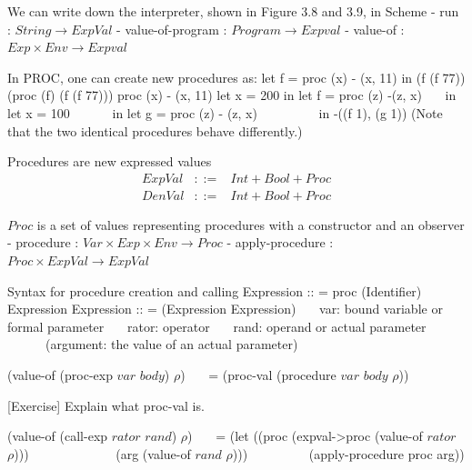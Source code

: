 \documentclass{article}
\begin{document}
\begin{huge}
We can write down the interpreter, shown in Figure 3.8 and 3.9, in Scheme \al
- run : $String \rightarrow ExpVal$ \al
- value-of-program : $Program \rightarrow Expval$ \al
- value-of : $Exp \times Env \rightarrow Expval$ 


In PROC, one can create new procedures as: \al
\al
let f = proc (x) - (x, 11) \al
in (f (f 77)) \al
\al
(proc (f) (f (f 77))) \al
proc (x) - (x, 11) \al
\al
let x = 200 \al
in let f = proc (z) -(z, x) \al
\ \ \ in let x = 100 \al
\ \ \ \ \ \ in let g = proc (z) - (z, x) \al
\ \ \ \ \ \ \ \ \ in -((f 1), (g 1)) \al
(Note that the two identical procedures behave differently.)


Procedures are new expressed values
\begin{eqnarray*}
ExpVal & ::= & Int + Bool + Proc \\
DenVal & ::= & Int + Bool + Proc 
\end{eqnarray*}

$Proc$ is a set of values representing procedures with a constructor and an observer \al
- procedure : $Var \times Exp \times Env \rightarrow Proc$  \al
- apply-procedure : $Proc \times ExpVal \rightarrow ExpVal$ 



Syntax for procedure creation and calling \al
\al
Expression :: = proc (Identifier) Expression  \al
Expression :: = (Expression Expression)  \al
\al
\ \ \ var: bound variable or formal parameter \al
\ \ \ rator: operator \al
\ \ \ rand: operand or actual parameter \al
\ \ \ \ \ \ (argument: the value of an actual parameter)


(value-of (proc-exp $var$ $body$) $\rho$) \al
\ \ \ = (proc-val (procedure $var$ $body$ $\rho$))

[Exercise] Explain what proc-val is. 

(value-of (call-exp $rator$ $rand$) $\rho$) \al
\ \ \ = (let ((proc (expval-\textgreater proc (value-of $rator$ $\rho$))) \al
\ \ \ \ \ \ \ \ \ \ \ \ \ (arg (value-of $rand$ $\rho$))) \al
\ \ \ \ \ \ \ \ \ (apply-procedure proc arg))


\end{huge}
\end{document}
